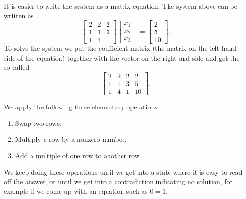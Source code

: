 \documentclass{ximera}
\begin{document}
It is easier to write the system as a matrix equation. The system above can be written as
\begin{equation*}
    \begin{bmatrix}
        2 & 2 & 2 \\
        1 & 1 & 3 \\
        1 & 4 & 1 
    \end{bmatrix}
    \begin{bmatrix}
        x_1 \\
        x_2 \\
        x_3
    \end{bmatrix} 
    =
    \begin{bmatrix}
        2 \\
        5 \\
        10
    \end{bmatrix} .
\end{equation*}
To solve the system we put the coefficient matrix (the matrix on the left-hand side of the equation) together with the vector on the right and side and get the so-called \emph{}
\begin{equation*}
    \left[
        \begin{array}{ccc|c}
            2 & 2 & 2 & 2 \\
            1 & 1 & 3 & 5 \\
            1 & 4 & 1 & 10
        \end{array}
    \right] .
\end{equation*}

We apply the following three elementary operations.
\begin{enumerate}
    \item Swap two rows.
    \item Multiply a row by a nonzero number.
    \item Add a multiple of one row to another row.
\end{enumerate}
We keep doing these operations until we get into a state where it is easy to read off the answer, or until we get into a contradiction indicating no solution, for example if we come up with an equation such as $0=1$.
\end{document}
